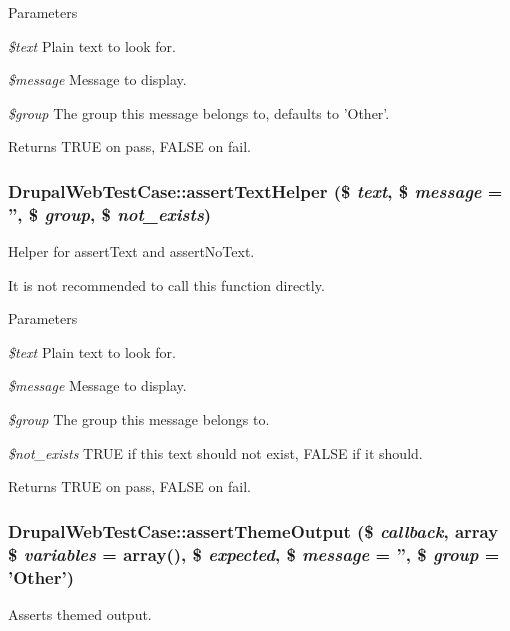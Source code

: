 \begin{DoxyParams}{Parameters}
\item[{\em \$text}]Plain text to look for. \item[{\em \$message}]Message to display. \item[{\em \$group}]The group this message belongs to, defaults to 'Other'. \end{DoxyParams}
\begin{DoxyReturn}{Returns}
TRUE on pass, FALSE on fail. 
\end{DoxyReturn}
\hypertarget{classDrupalWebTestCase_af32f99ced29cbfd6ad8b94f2ac64869a}{
\subsubsection[{assertTextHelper}]{\setlength{\rightskip}{0pt plus 5cm}DrupalWebTestCase::assertTextHelper (\$ {\em text}, \/  \$ {\em message} = {\ttfamily ''}, \/  \$ {\em group}, \/  \$ {\em not\_\-exists})}}
\label{classDrupalWebTestCase_af32f99ced29cbfd6ad8b94f2ac64869a}
Helper for assertText and assertNoText.

It is not recommended to call this function directly.


\begin{DoxyParams}{Parameters}
\item[{\em \$text}]Plain text to look for. \item[{\em \$message}]Message to display. \item[{\em \$group}]The group this message belongs to. \item[{\em \$not\_\-exists}]TRUE if this text should not exist, FALSE if it should. \end{DoxyParams}
\begin{DoxyReturn}{Returns}
TRUE on pass, FALSE on fail. 
\end{DoxyReturn}
\hypertarget{classDrupalWebTestCase_af6ae7851b6b79b5ec0169eb7b67ad518}{
\subsubsection[{assertThemeOutput}]{\setlength{\rightskip}{0pt plus 5cm}DrupalWebTestCase::assertThemeOutput (\$ {\em callback}, \/  array \$ {\em variables} = {\ttfamily array()}, \/  \$ {\em expected}, \/  \$ {\em message} = {\ttfamily ''}, \/  \$ {\em group} = {\ttfamily 'Other'})}}
\label{classDrupalWebTestCase_af6ae7851b6b79b5ec0169eb7b67ad518}
Asserts themed output.


